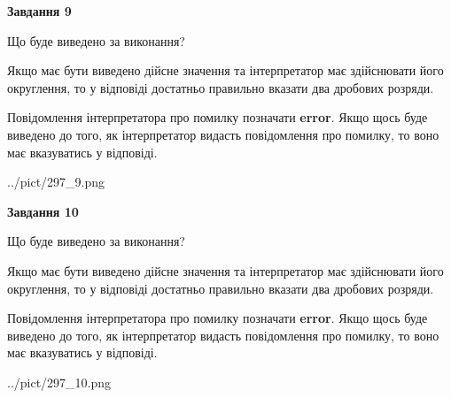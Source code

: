 \documentclass[12pt, ukrainian]{article}
\begin{document}
{\begin {Large}
{\begin {center}\textbf{Завдання 9}\end {center}}\par
Що буде виведено за виконання? \par

Якщо має бути виведено дійсне значення та інтерпретатор має здійснювати його округлення, 
то у відповіді достатньо правильно вказати два дробових розряди.

Повідомлення інтерпретатора про помилку позначати \textbf{error}.
Якщо щось буде виведено до того, як інтерпретатор видасть повідомлення про помилку, 
то воно має вказуватись у відповіді. \par

\begin{center}
	{../pict/297_9.png}
\end{center}
\newpage

{\begin {center}\textbf{Завдання 10}\end {center}}\par
Що буде виведено за виконання? \par

Якщо має бути виведено дійсне значення та інтерпретатор має здійснювати його округлення, 
то у відповіді достатньо правильно вказати два дробових розряди.

Повідомлення інтерпретатора про помилку позначати \textbf{error}.
Якщо щось буде виведено до того, як інтерпретатор видасть повідомлення про помилку, 
то воно має вказуватись у відповіді. \par

\begin{center}
	{../pict/297_10.png}
\end{center}
\newpage

\end {Large}}
\end{document}

